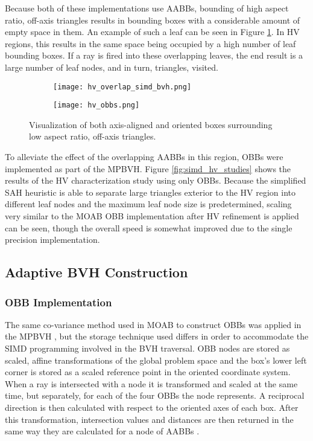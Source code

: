 Because both of these implementations use AABBs, bounding of high aspect ratio,
off-axis triangles results in bounding boxes with a considerable amount of empty
space in them. An example of such a leaf can be seen in Figure
\ref{fig:hv_overlap_simd_bvh}. In HV regions, this results in the same
space being occupied by a high number of leaf bounding boxes. If a ray is fired
into these overlapping leaves, the end result is a large number of leaf nodes,
and in turn, triangles, visited.

\begin{figure}
  \centering
  \begin{subfigure}{.5\textwidth}
    \centering
    \texttt{[image: hv\_overlap\_simd\_bvh.png]}
  \end{subfigure}%
  \begin{subfigure}{.5\textwidth}
    \centering
    \texttt{[image: hv\_obbs.png]}
  \end{subfigure}
  \caption[Bounding boxes of the MPBVH in the high valence
    region.]{Visualization of both axis-aligned and oriented boxes surrounding
    low aspect ratio, off-axis triangles.}
  \label{fig:hv_overlap_simd_bvh}
\end{figure}

To alleviate the effect of the overlapping AABBs in this region, OBBs were
implemented as part of the MPBVH. Figure \ref{fig:simd_hv_studies} shows the
results of the HV characterization study using only OBBs. Because the simplified SAH heuristic is able to separate
large triangles exterior to the HV region into different leaf nodes and the
maximum leaf node size is predetermined, scaling very similar to the MOAB OBB
implementation after HV refinement is applied can be seen, though the overall
speed is somewhat improved due to the single precision implementation.

\subsection{Adaptive BVH Construction}

\subsubsection{OBB Implementation}

The same co-variance method used in MOAB to construct OBBs was applied in the
MPBVH \cite{Weghorst_1984}, but the storage technique used differs in order to
accommodate the SIMD programming involved in the BVH traversal. OBB nodes are
stored as scaled, affine transformations of the global problem space and the
box's lower left corner is stored as a scaled reference point in the oriented
coordinate system. When a ray is intersected with a node it is transformed and
scaled at the same time, but separately, for each of the four OBBs the node
represents. A reciprocal direction is then calculated with respect to the
oriented axes of each box. After this transformation, intersection values and
distances are then returned in the same way they are calculated for a node of
AABBs \cite{Wald_2014}.


